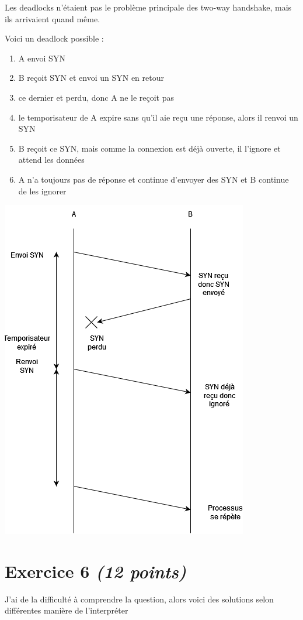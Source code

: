 \documentclass{article}
\begin{document}
Les deadlocks n'étaient pas le problème principale des two-way handshake, mais ils arrivaient quand même.

Voici un deadlock possible :
\begin{enumerate}
    \item A envoi SYN
    \item B reçoit SYN et envoi un SYN en retour
    \item ce dernier et perdu, donc A ne le reçoit pas
    \item le temporisateur de A expire sans qu'il aie reçu une réponse, alors il renvoi un SYN
    \item B reçoit ce SYN, mais comme la connexion est déjà ouverte, il l'ignore et attend les données
    \item A n'a toujours pas de réponse et continue d'envoyer des SYN et B continue de les ignorer
\end{enumerate}

\includegraphics[scale=.8]{q5.png}


\clearpage

\section{Exercice 6 \emph{(12 points)}}
J'ai de la difficulté à comprendre la question, alors voici des solutions selon différentes manière de l'interpréter
\end{document}

